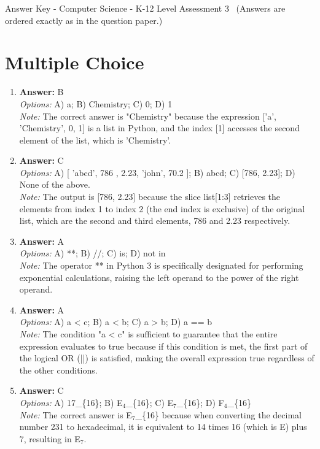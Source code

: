 \documentclass[12pt]{article}
\begin{document}
\begin{center}
Answer Key - Computer Science - K-12 Level Assessment 3 \
\small (Answers are ordered exactly as in the question paper.)
\end{center}

\section*{Multiple Choice}
\begin{enumerate}[label=\arabic*.]
\item \textbf{Answer:} B
\\ \textit{Options:} A) a; B) Chemistry; C) 0; D) 1
\\ \textit{Note:} The correct answer is "Chemistry" because the expression ['a', 'Chemistry', 0, 1] is a list in Python, and the index [1] accesses the second element of the list, which is 'Chemistry'.
\item \textbf{Answer:} C
\\ \textit{Options:} A) [ 'abcd', 786 , 2.23, 'john', 70.2 ]; B) abcd; C) [786, 2.23]; D) None of the above.
\\ \textit{Note:} The output is [786, 2.23] because the slice list[1:3] retrieves the elements from index 1 to index 2 (the end index is exclusive) of the original list, which are the second and third elements, 786 and 2.23 respectively.
\item \textbf{Answer:} A
\\ \textit{Options:} A) **; B) //; C) is; D) not in
\\ \textit{Note:} The operator ** in Python 3 is specifically designated for performing exponential calculations, raising the left operand to the power of the right operand.
\item \textbf{Answer:} A
\\ \textit{Options:} A) a \textless{} c; B) a \textless{} b; C) a \textgreater{} b; D) a == b
\\ \textit{Note:} The condition "a \textless{} c" is sufficient to guarantee that the entire expression evaluates to true because if this condition is met, the first part of the logical OR (||) is satisfied, making the overall expression true regardless of the other conditions.
\item \textbf{Answer:} C
\\ \textit{Options:} A) 17\_\{16\}; B) E$_{4}$\_\{16\}; C) E$_{7}$\_\{16\}; D) F$_{4}$\_\{16\}
\\ \textit{Note:} The correct answer is E$_{7}$\_\{16\} because when converting the decimal number 231 to hexadecimal, it is equivalent to 14 times 16 (which is E) plus 7, resulting in E$_{7}$.
\end{enumerate}
\end{document}
